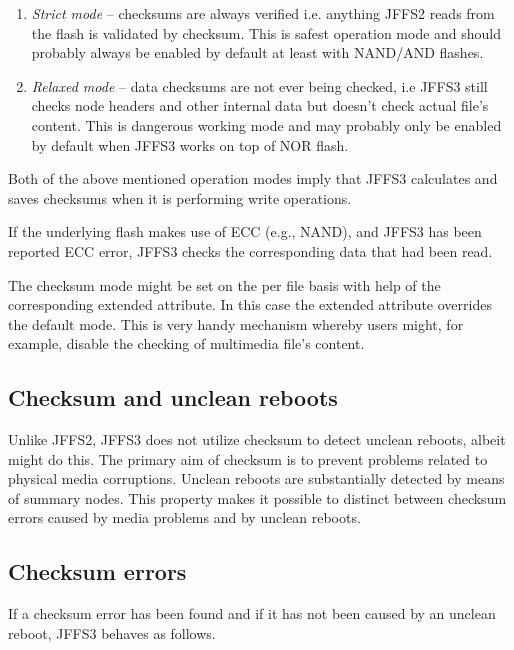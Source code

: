 \documentclass[12pt,a4paper,oneside,titlepage]{article}
\begin{document}
\begin{enumerate}
\item \emph{Strict mode} -- checksums are always verified i.e. anything JFFS2
reads from the flash is validated by checksum. This is safest operation mode and
should probably always be enabled by default at least with NAND/AND flashes.

\item \emph{Relaxed mode} -- data checksums are not ever being checked, i.e
JFFS3 still checks node headers and other internal data but doesn't check actual
file's content. This is dangerous working mode and may probably only be enabled
by default when JFFS3 works on top of NOR flash.
\end{enumerate}

Both of the above mentioned operation modes imply that JFFS3 calculates and
saves checksums when it is performing write operations.

If the underlying flash makes use of ECC (e.g., NAND), and JFFS3 has been
reported ECC error, JFFS3 checks the corresponding data that had been read.

The checksum mode might be set on the per file basis with
help of the corresponding extended attribute. In this case the extended
attribute overrides the default mode. This is very handy mechanism
whereby users might, for example, disable the checking of multimedia
file's content.

%
%
\subsection{Checksum and unclean reboots}
Unlike JFFS2, JFFS3 does not utilize checksum to detect unclean reboots, albeit
might do this. The primary aim of checksum is to prevent problems
related to physical media corruptions. Unclean reboots are substantially
detected by means of summary nodes. This property makes it possible to distinct
between checksum errors caused by media problems and by unclean reboots.

%
%
\subsection{Checksum errors}
If a checksum error has been found and if it has not been caused by
an unclean reboot, JFFS3 behaves as follows.
\end{document}
